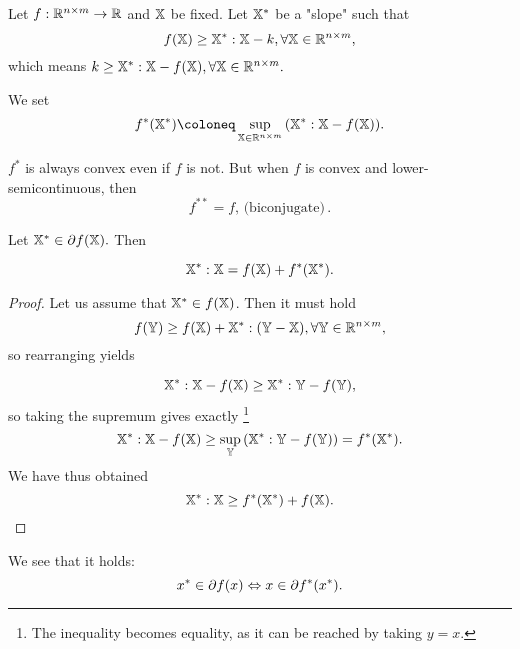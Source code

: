 \documentclass[11pt]{scrartcl} %
\begin{document}
\begin{definition}
Let $f: {\mathbb R}^{n \times m} \to {\mathbb R}$ and $\mathbb{X}$ be fixed. Let $\mathbb{X}^{*}$ be a "slope" such that
\[
	f\qty(\mathbb{X}) \geq \mathbb{X}^{*} : \mathbb{X} - k, \forall \mathbb{X} \in {\mathbb R}^{n \times m},
\]
which means $k \geq \mathbb{X}^{*} : \mathbb{X} - f\qty(\mathbb{X}), \forall \mathbb{X} \in {\mathbb R}^{n \times m}.$

We set
\[
	f^{*}\qty(\tensorq{X}^{*}) \coloneq \sup_{\tensorq{X} \in \R^{n \times m}}\qty(\tensorq{X}^{*} : \tensorq{X} - f\qty(\tensorq{X})).
\]
\end{definition}

\begin{remark}
	$f^{*}$ is always convex even if $f$ is not. But when $f$ is convex and lower-semicontinuous, then
	\[
		f^{**} = f, \, \text{(biconjugate)} \,.
	\]
\end{remark}

\begin{theorem}
Let $\mathbb{X}^{*} \in \partial f\qty(\mathbb{X}).$ Then

\[
	\mathbb{X}^{*} : \mathbb{X} = f\qty(\mathbb{X}) + f^{*}\qty(\mathbb{X}^{*}).
\]
\begin{proof}
Let us assume that $\mathbb{X}^{*} \in f\qty(\mathbb{X})$. Then it must hold
\[
	f\qty(\mathbb{Y}) \geq f\qty(\mathbb{X}) + \mathbb{X}^{*} : \qty(\mathbb{Y} - \mathbb{X}), \forall \mathbb{Y} \in {\mathbb R}^{n \times m},
\]
so rearranging yields

\[
	\mathbb{X}^{*} : \mathbb{X} - f\qty(\mathbb{X}) \geq \mathbb{X}^{*} : \mathbb{Y} - f\qty(\mathbb{Y}),
\]
so taking the supremum gives exactly \footnote{The inequality becomes equality, as it can be reached by taking $y=x$.}
\[
	\mathbb{X}^{*} : \mathbb{X} - f\qty(\mathbb{X}) \geq \sup_{\mathbb{Y}}\qty(\mathbb{X}^{*} : \mathbb{Y} - f\qty(\mathbb{Y})) =f^{*}\qty(\mathbb{X}^{*}).
\]
We have thus obtained
\[
	\mathbb{X}^{*} : \mathbb{X} \geq f^{*}\qty(\mathbb{X}^{*}) + f\qty(\mathbb{X}).
\]

\end{proof}
\end{theorem}

\begin{remark}
	We see that it holds:
	\[
		x^{*} \in \partial f(x) \Leftrightarrow x \in \partial f^{*}\qty(x^{*}).
	\]
\end{remark}
\end{document}
